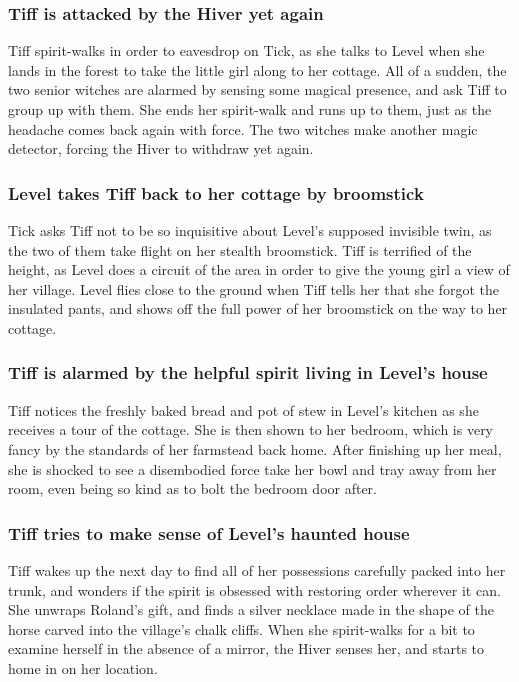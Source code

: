 \subsubsection{\Gls{Tiff} is attacked by the \Gls{Hiver} yet again}
\Gls{Tiff} spirit-walks in order to eavesdrop on \Gls{Tick}, as she talks to \Gls{Level} when she
lands in the forest to take the little girl along to her cottage. All of a sudden, the two senior
witches are alarmed by sensing some magical presence, and ask \Gls{Tiff} to group up with them.
She ends her spirit-walk and runs up to them, just as the headache comes back again with force. The
two witches make another magic detector, forcing the \Gls{Hiver} to withdraw yet again.

\subsubsection{\Gls{Level} takes \Gls{Tiff} back to her cottage by broomstick}
\Gls{Tick} asks \Gls{Tiff} not to be so inquisitive about \Gls{Level}'s supposed invisible twin,
as the two of them take flight on her stealth broomstick. \Gls{Tiff} is terrified of the height,
as \Gls{Level} does a circuit of the area in order to give the young girl a view of her village.
\Gls{Level} flies close to the ground when \Gls{Tiff} tells her that she forgot the insulated pants,
and shows off the full power of her broomstick on the way to her cottage.

\subsubsection{\Gls{Tiff} is alarmed by the helpful spirit living in \Gls{Level}'s house}
\Gls{Tiff} notices the freshly baked bread and pot of stew in \Gls{Level}'s kitchen as she receives
a tour of the cottage. She is then shown to her bedroom, which is very fancy by the standards of her
farmstead back home. After finishing up her meal, she is shocked to see a disembodied force take her
bowl and tray away from her room, even being so kind as to bolt the bedroom door after.

\subsubsection{\Gls{Tiff} tries to make sense of \Gls{Level}'s haunted house}
\Gls{Tiff} wakes up the next day to find all of her possessions carefully packed into her trunk,
and wonders if the spirit is obsessed with restoring order wherever it can. She unwraps
\Gls{Roland}'s gift, and finds a silver necklace made in the shape of the horse carved into the
village's chalk cliffs. When she spirit-walks for a bit to examine herself in the absence of a
mirror, the \Gls{Hiver} senses her, and starts to home in on her location.

